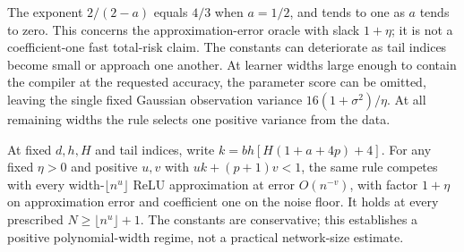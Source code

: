 The exponent $2/(2-a)$ equals $4/3$ when $a=1/2$, and tends to one as $a$ tends to zero. This concerns the approximation-error oracle with slack $1+\eta$; it is not a coefficient-one fast total-risk claim. The constants can deteriorate as tail indices become small or approach one another. At learner widths large enough to contain the compiler at the requested accuracy, the parameter score can be omitted, leaving the single fixed Gaussian observation variance $16(1+\sigma^2)/\eta$. At all remaining widths the rule selects one positive variance from the data.

At fixed $d,h,H$ and tail indices, write
$k=b h[H(1+a+4p)+4]$. For any fixed $\eta>0$ and positive $u,v$ with
$uk+(p+1)v<1$, the same rule competes with every width-$\lfloor n^u\rfloor$ ReLU approximation at error $O(n^{-v})$, with factor $1+\eta$ on approximation error and coefficient one on the noise floor. It holds at every prescribed $N\ge\lfloor n^u\rfloor+1$. The constants are conservative; this establishes a positive polynomial-width regime, not a practical network-size estimate.
